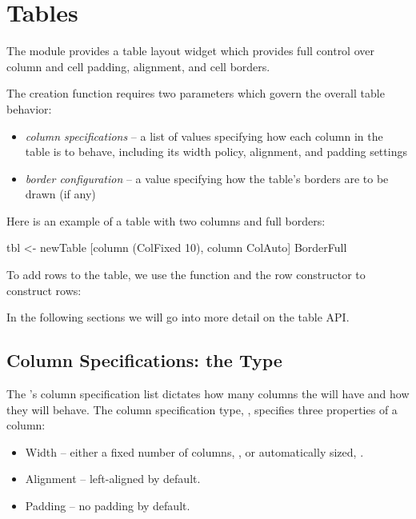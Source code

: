 \section{Tables}
\label{sec:tables}

The  module provides a table layout widget which provides
full control over column and cell padding, alignment, and cell
borders.

The  creation function  requires two parameters
which govern the overall table behavior:

\begin{itemize}
\item \textit{column specifications} -- a list of values specifying
  how each column in the table is to behave, including its width
  policy, alignment, and padding settings
\item \textit{border configuration} -- a value specifying how the
  table's borders are to be drawn (if any)
\end{itemize}

Here is an example of a table with two columns and full borders:

\begin{haskellcode}
 tbl <- newTable [column (ColFixed 10), column ColAuto] BorderFull
\end{haskellcode}

To add rows to the table, we use the  function and the row
constructor  to construct rows:


In the following sections we will go into more detail on the table
API.

\subsection{Column Specifications: the  Type}
\label{sec:columnspecs}

The 's column specification list dictates how many
columns the  will have and how they will behave.  The column
specification type, , specifies three properties of a
column:

\begin{itemize}
\item Width -- either a fixed number of columns, , or
  automatically sized, .
\item Alignment -- left-aligned by default.
\item Padding -- no padding by default.
\end{itemize}

